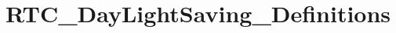 \hypertarget{group___r_t_c___day_light_saving___definitions}{\section{R\-T\-C\-\_\-\-Day\-Light\-Saving\-\_\-\-Definitions}
\label{group___r_t_c___day_light_saving___definitions}
}
